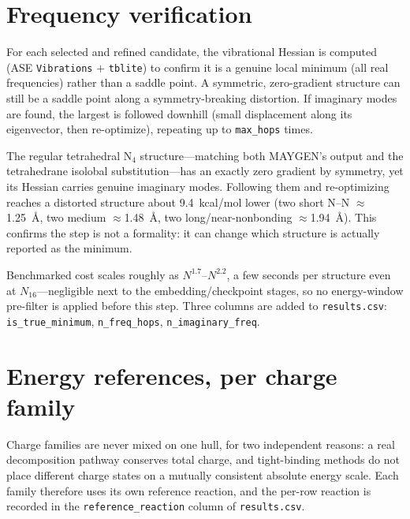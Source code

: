 \documentclass[11pt,a4paper]{article}
\begin{document}
\section{Frequency verification}
\label{sec:frequency}

For each selected and refined candidate, the vibrational Hessian is computed
(ASE \texttt{Vibrations} $+$ \texttt{tblite}) to confirm it is a genuine
local minimum (all real frequencies) rather than a saddle point. A
symmetric, zero-gradient structure can still be a saddle point along a
symmetry-breaking distortion. If imaginary modes are found, the largest is
followed downhill (small displacement along its eigenvector, then
re-optimize), repeating up to \texttt{max\_hops} times.

\begin{finding}
The regular tetrahedral N$_4$ structure---matching both MAYGEN's output and
the tetrahedrane isolobal substitution---has an exactly zero gradient by
symmetry, yet its Hessian carries genuine imaginary modes. Following them
and re-optimizing reaches a distorted structure about 9.4~kcal/mol lower
(two short N--N $\approx$1.25~\AA, two medium $\approx$1.48~\AA, two
long/near-nonbonding $\approx$1.94~\AA). This confirms the step is not a
formality: it can change which structure is actually reported as the
minimum.
\end{finding}

Benchmarked cost scales roughly as $N^{1.7}$--$N^{2.2}$, a few seconds per
structure even at $N_{16}$---negligible next to the embedding/checkpoint
stages, so no energy-window pre-filter is applied before this step. Three
columns are added to \texttt{results.csv}: \texttt{is\_true\_minimum},
\texttt{n\_freq\_hops}, \texttt{n\_imaginary\_freq}.

\section{Energy references, per charge family}
\label{sec:references}

Charge families are never mixed on one hull, for two independent reasons: a
real decomposition pathway conserves total charge, and tight-binding methods
do not place different charge states on a mutually consistent absolute
energy scale. Each family therefore uses its own reference reaction, and the
per-row reaction is recorded in the \texttt{reference\_reaction} column of
\texttt{results.csv}.
\end{document}
